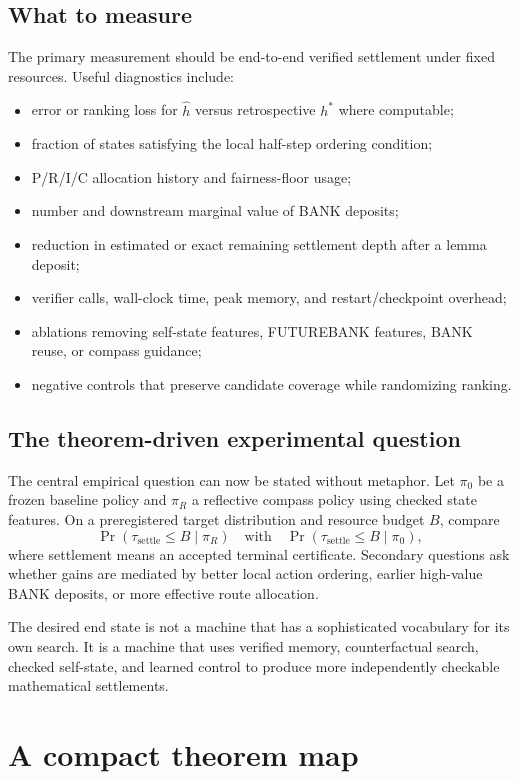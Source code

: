 \documentclass[11pt]{article}
\theoremstyle{definition}
\theoremstyle{remark}
\begin{document}
\subsection{What to measure}
The primary measurement should be end-to-end verified settlement under fixed resources. Useful diagnostics include:
\begin{itemize}
\item error or ranking loss for $\widehat h$ versus retrospective $h^*$ where computable;
\item fraction of states satisfying the local half-step ordering condition;
\item P/R/I/C allocation history and fairness-floor usage;
\item number and downstream marginal value of BANK deposits;
\item reduction in estimated or exact remaining settlement depth after a lemma deposit;
\item verifier calls, wall-clock time, peak memory, and restart/checkpoint overhead;
\item ablations removing self-state features, FUTUREBANK features, BANK reuse, or compass guidance;
\item negative controls that preserve candidate coverage while randomizing ranking.
\end{itemize}

\subsection{The theorem-driven experimental question}
The central empirical question can now be stated without metaphor. Let $\pi_0$ be a frozen baseline policy and $\pi_R$ a reflective compass policy using checked state features. On a preregistered target distribution and resource budget $B$, compare
\[
\Pr(\tau_{\mathrm{settle}}\le B\mid\pi_R)
\quad\text{with}\quad
\Pr(\tau_{\mathrm{settle}}\le B\mid\pi_0),
\]
where settlement means an accepted terminal certificate. Secondary questions ask whether gains are mediated by better local action ordering, earlier high-value BANK deposits, or more effective route allocation.

The desired end state is not a machine that has a sophisticated vocabulary for its own search. It is a machine that uses verified memory, counterfactual search, checked self-state, and learned control to produce more independently checkable mathematical settlements.

\section{A compact theorem map}
\end{document}
